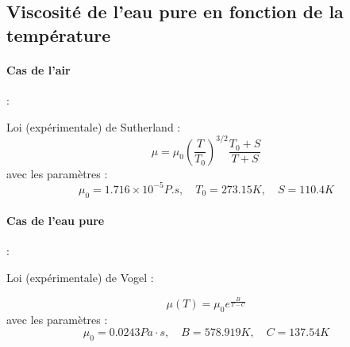{\color{red} 
\subsection{Viscosité de l'eau pure en fonction de la température}

\paragraph{Cas de l'air} :

Loi (expérimentale) de Sutherland : 
$$
\mu = \mu_0 \left( \frac{T}{T_0} \right)^{3/2} \frac{ T_0 + S }{T+S} 
$$
avec les paramètres :
$$
\mu_0 = 	1.716 \times 10^{-5} P.s,  \quad T_0 = 273.15 K , \quad S = 110.4 K
$$

\paragraph{Cas de l'eau pure} :

Loi (expérimentale)  de Vogel :

$$
\mu(T)  = \mu_0 e^{\frac{B}{T-C}}
$$
avec les paramètres : 
$$ 
\mu_0 = 0.0243 Pa\cdot s, \quad B = 578.919 K, \quad C = 137.54 K
$$
 }



